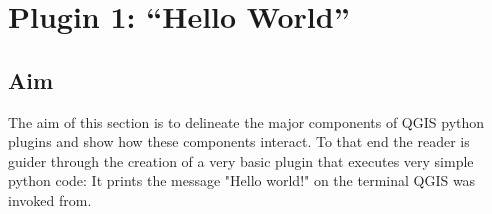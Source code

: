 \section{Plugin 1: ``Hello World''}
\label{sect:plugin_1}
\subsection{Aim}
\label{ssect:plugin_1_aim}
\par %
The aim of this section is to delineate the major components of QGIS python plugins and show how these components interact. To that end the reader is guider through the creation of a very basic plugin that executes very simple python code: It prints the message "Hello world!" on the terminal QGIS was invoked from.
